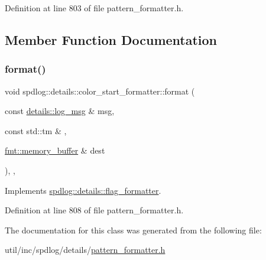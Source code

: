 Definition at line 803 of file pattern\+\_\+formatter.\+h.



\subsection{Member Function Documentation}
\mbox{\label{classspdlog_1_1details_1_1color__start__formatter_af91a839656b9128edbc7f0d6ea297d3f}} 
\subsubsection{\texorpdfstring{format()}{format()}}
{\footnotesize\ttfamily void spdlog\+::details\+::color\+\_\+start\+\_\+formatter\+::format (\begin{DoxyParamCaption}\item[{const \hyperlink{structspdlog_1_1details_1_1log__msg}{details\+::log\+\_\+msg} \&}]{msg,  }\item[{const std\+::tm \&}]{,  }\item[{\hyperlink{format_8h_a21cbf729f69302f578e6db21c5e9e0d2}{fmt\+::memory\+\_\+buffer} \&}]{dest }\end{DoxyParamCaption})\hspace{0.3cm}{\ttfamily [inline]}, {\ttfamily [override]}, {\ttfamily [virtual]}}



Implements \hyperlink{classspdlog_1_1details_1_1flag__formatter_a33fb3e42a4c8200cceb833d92b53fb67}{spdlog\+::details\+::flag\+\_\+formatter}.



Definition at line 808 of file pattern\+\_\+formatter.\+h.



The documentation for this class was generated from the following file\+:\begin{DoxyCompactItemize}
\item 
util/inc/spdlog/details/\hyperlink{pattern__formatter_8h}{pattern\+\_\+formatter.\+h}\end{DoxyCompactItemize}
